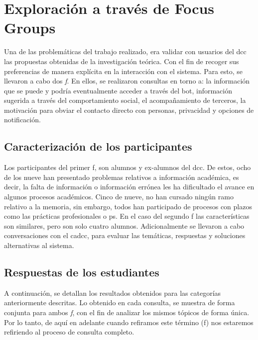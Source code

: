 \section{Exploración a través de Focus Groups}\label{sec:focus}

    \par Una de las problemáticas del trabajo realizado, era validar con usuarios del \acrshort{dcc} las propuestas obtenidas de la investigación teórica. Con el fin de recoger sus preferencias de manera explícita en la interacción con el sistema. Para esto, se llevaron a cabo dos \textit{\acrlong{f}}. En ellos, se realizaron consultas en torno a: la información que se puede y podría eventualmente acceder a través del bot,  información sugerida a través del comportamiento social, el acompañamiento de terceros, la motivación para obviar el contacto directo con personas, privacidad y opciones de notificación.
    
    \subsection{Caracterización de los participantes}

    \par Los participantes del primer \acrshort{f}, son alumnos y ex-alumnos del \acrshort{dcc}. De estos, ocho de los nueve han presentado problemas relativos a información académica, es decir, la falta de información o información errónea les ha dificultado el avance en algunos procesos académicos. Cinco de nueve, no han cursado ningún ramo relativo a la memoria, sin embargo, todos han participado de procesos con plazos como las prácticas profesionales o \acrlong{ps}. En el caso del segundo \acrlong{f} las características son similares, pero son solo cuatro alumnos. Adicionalmente se llevaron a cabo conversaciones con el \acrshort{cadcc}, para evaluar las temáticas, respuestas y soluciones alternativas al sistema.
    
    \subsection{Respuestas de los estudiantes}

    \par A continuación, se detallan los resultados obtenidos para las categorías anteriormente descritas. Lo obtenido en cada consulta, se muestra de forma conjunta para ambos \textit{\acrlong{f}}, con el fin de analizar los mismos tópicos de forma única. Por lo tanto, de aquí en adelante cuando refiramos este término (\acrlong{f}) nos estaremos refiriendo al proceso de consulta completo.
    
